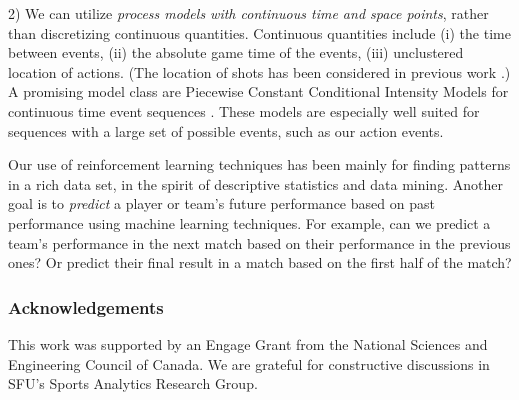 2) We can utilize {\em process models with continuous time and space points}, rather than discretizing continuous quantities. 
Continuous quantities include 
(i) the time between events, %
(ii) the absolute game time of the events, %
(iii) unclustered location of actions. 
(The location of shots has been considered in previous work \citep{Krzywicki2005}.)  A promising model class are Piecewise Constant Conditional Intensity Models for continuous time event sequences \citep{Gunawardana2011,Parikh2012}. These models are especially well suited for sequences with a large set of possible events, such as our action events. 

Our use of reinforcement learning techniques has been mainly for finding patterns in a rich data set, in the spirit of descriptive statistics and data mining. Another goal is to {\em predict} a player or team's future performance based on past performance using machine learning techniques. For example, can we predict a team's performance in the next match based on their performance in the previous ones? Or predict their final result in a match based on the first half of the match?



\subsubsection*{Acknowledgements} This work was supported by an Engage Grant from the National Sciences and Engineering Council of Canada. We are grateful for constructive discussions in SFU's Sports Analytics Research Group. 
\newpage


